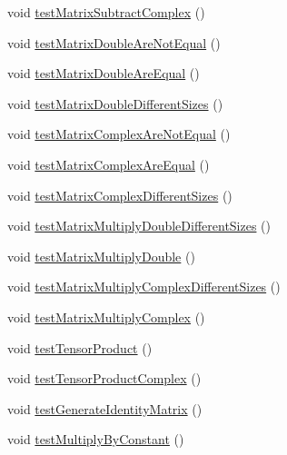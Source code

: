\begin{DoxyCompactItemize}
void \hyperlink{classcom_1_1ars_1_1quantum_1_1utils_1_1_matrix_operations_test_a7b8069b3de70b2eb9d655eb142002d0b}{test\+Matrix\+Subtract\+Complex} ()
\item 
void \hyperlink{classcom_1_1ars_1_1quantum_1_1utils_1_1_matrix_operations_test_ae47b404462da670081830dded82d3252}{test\+Matrix\+Double\+Are\+Not\+Equal} ()
\item 
void \hyperlink{classcom_1_1ars_1_1quantum_1_1utils_1_1_matrix_operations_test_a8cc1964185da3b73b5a1f4f38f0bb25d}{test\+Matrix\+Double\+Are\+Equal} ()
\item 
void \hyperlink{classcom_1_1ars_1_1quantum_1_1utils_1_1_matrix_operations_test_a2263b15fae56de8579bc572cd67a5db2}{test\+Matrix\+Double\+Different\+Sizes} ()
\item 
void \hyperlink{classcom_1_1ars_1_1quantum_1_1utils_1_1_matrix_operations_test_a510001ff5f110f317a003aad024b7814}{test\+Matrix\+Complex\+Are\+Not\+Equal} ()
\item 
void \hyperlink{classcom_1_1ars_1_1quantum_1_1utils_1_1_matrix_operations_test_a1f520804726b4695d38491efb081a62f}{test\+Matrix\+Complex\+Are\+Equal} ()
\item 
void \hyperlink{classcom_1_1ars_1_1quantum_1_1utils_1_1_matrix_operations_test_a2067fc7495133c6604494ae61c0b21f5}{test\+Matrix\+Complex\+Different\+Sizes} ()
\item 
void \hyperlink{classcom_1_1ars_1_1quantum_1_1utils_1_1_matrix_operations_test_aabeb9f046a3146998afea51488839af6}{test\+Matrix\+Multiply\+Double\+Different\+Sizes} ()
\item 
void \hyperlink{classcom_1_1ars_1_1quantum_1_1utils_1_1_matrix_operations_test_a32f8097861b74ba4b4ee3d601fcba520}{test\+Matrix\+Multiply\+Double} ()
\item 
void \hyperlink{classcom_1_1ars_1_1quantum_1_1utils_1_1_matrix_operations_test_a9ee4aca46fc14b35d2f779747e609239}{test\+Matrix\+Multiply\+Complex\+Different\+Sizes} ()
\item 
void \hyperlink{classcom_1_1ars_1_1quantum_1_1utils_1_1_matrix_operations_test_aa87b6e37af0eb7ae67984f35548d64dc}{test\+Matrix\+Multiply\+Complex} ()
\item 
void \hyperlink{classcom_1_1ars_1_1quantum_1_1utils_1_1_matrix_operations_test_a531c3daf0534ee2d2776e648f0476ae5}{test\+Tensor\+Product} ()
\item 
void \hyperlink{classcom_1_1ars_1_1quantum_1_1utils_1_1_matrix_operations_test_ad96b1789d5fc5c530d9e6e64c9b8f374}{test\+Tensor\+Product\+Complex} ()
\item 
void \hyperlink{classcom_1_1ars_1_1quantum_1_1utils_1_1_matrix_operations_test_a97c53b085b9edf71d4b9488f19b6ba40}{test\+Generate\+Identity\+Matrix} ()
\item 
void \hyperlink{classcom_1_1ars_1_1quantum_1_1utils_1_1_matrix_operations_test_a523958e57a1bc8ad1ca05c15cfbaa4d5}{test\+Multiply\+By\+Constant} ()
\end{DoxyCompactItemize}


